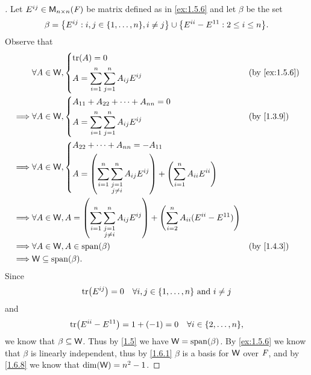 \begin{proof}[]
  Let \(E^{i j} \in \mathsf{M}_{{n} \times n}({\mathit{F}})\) be matrix defined as in \cref{ex:1.5.6} and let \(\beta\) be the set
  \[
    \beta = \set{E^{i j} : i, j \in \set{1, \dots, n}, i \neq j} \cup \set{E^{i i} - E^{1 1} : 2 \leq i \leq n}.
  \]
  Observe that
  \begin{align*}
             & \forall A \in \W, \begin{dcases}
      \tr{A} = 0 \\
      A = \sum_{i = 1}^n \sum_{j = 1}^n A_{i j} E^{i j}
    \end{dcases}                   &  & \text{(by \cref{ex:1.5.6})} \\
    \implies & \forall A \in \W, \begin{dcases}
      A_{1 1} + A_{2 2} + \cdots + A_{n n} = 0 \\
      A = \sum_{i = 1}^n \sum_{j = 1}^n A_{i j} E^{i j}
    \end{dcases}                   &  & \text{(by \cref{1.3.9})}    \\
    \implies & \forall A \in \W, \begin{dcases}
      A_{2 2} + \cdots + A_{n n} = -A_{1 1}        \\
      A = \pa{\sum_{i = 1}^n \sum_{\substack{j = 1 \\ j \neq i}}^n A_{i j} E^{i j}} + \pa{\sum_{i = 1}^n A_{i i} E^{i i}}
    \end{dcases}                                                    \\
    \implies & \forall A \in \W, A = \pa{\sum_{i = 1}^n \sum_{\substack{j = 1                                  \\ j \neq i}}^n A_{i j} E^{i j}} + \pa{\sum_{i = 2}^n A_{i i} (E^{i i} - E^{1 1})} \\
    \implies & \forall A \in \W, A \in \spn{\beta}                            &  & \text{(by \cref{1.4.3})}    \\
    \implies & \W \subseteq \spn{\beta}.
  \end{align*}
  Since
  \[
    \tr{E^{i j}} = 0 \quad \forall i, j \in \set{1, \dots, n} \text{ and } i \neq j
  \]
  and
  \[
    \tr{E^{i i} - E^{1 1}} = 1 + (-1) = 0 \quad \forall i \in \set{2, \dots, n},
  \]
  we know that \(\beta \subseteq \mathsf{W}\).
  Thus by \cref{1.5} we have \(\W = \spn{\beta}\).
  By \cref{ex:1.5.6} we know that \(\beta\) is linearly independent, thus by \cref{1.6.1} \(\beta\) is a basis for \(\mathsf{W}\) over \(\mathit{F}\), and by \cref{1.6.8} we know that \(\dim(\mathsf{W}) = n^2 - 1\).
\end{proof}

